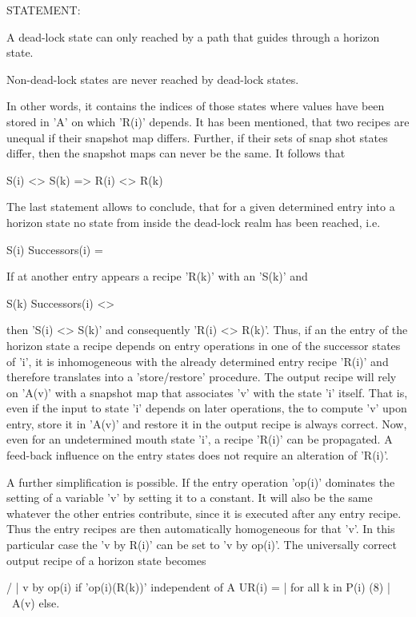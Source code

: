 \documentclass[12pt]{article}
\begin{document}
STATEMENT: 

   A dead-lock state can only reached by a path that guides through a horizon
   state. 
   
   Non-dead-lock states are never reached by dead-lock states.
   
In other words, it contains the indices of those states where values have been
stored in 'A' on which 'R(i)' depends. It has been mentioned, that two recipes
are unequal if their snapshot map differs. Further, if their sets of snap shot
states differ, then the snapshot maps can never be the same. It follows that

                   S(i) <> S(k) => R(i) <> R(k)

The last statement allows to conclude, that for a given determined entry into a
horizon state no state from inside the dead-lock realm has been reached, i.e.

              S(i) \intersection Successors(i) = \emptyset

If at another entry appears a recipe 'R(k)' with an 'S(k)' and 

              S(k) \intersection Successors(i) <> \emptyset

then 'S(i) <> S(k)' and consequently 'R(i) <> R(k)'. Thus, if an the entry of
the horizon state a recipe depends on entry operations in one of the successor
states of 'i', it is inhomogeneous with the already determined entry recipe
'R(i)' and therefore translates into a 'store/restore' procedure. The output
recipe will rely on 'A(v)' with a snapshot map that associates 'v' with the
state 'i' itself. That is, even if the input to state 'i' depends on later
operations, the to compute 'v' upon entry, store it in 'A(v)' and restore it in
the output recipe is always correct. Now, even for an undetermined mouth state
'i', a recipe 'R(i)' can be propagated.  A feed-back influence on the entry
states does not require an alteration of 'R(i)'.

A further simplification is possible. If the entry operation 'op(i)' dominates
the setting of a variable 'v' by setting it to a constant.  It will also be the
same whatever the other entries contribute, since it is executed after any
entry recipe. Thus the entry recipes are then automatically homogeneous for
that 'v'. In this particular case the 'v by R(i)' can be set to 'v by op(i)'.
The universally correct output recipe of a horizon state becomes 

                  /
                  |   v by op(i)    if 'op(i)(R(k))' independent of A
          UR(i) = |                     for all k in P(i)                   (8)
                  |
                  \   A(v)          else.
\end{document}

